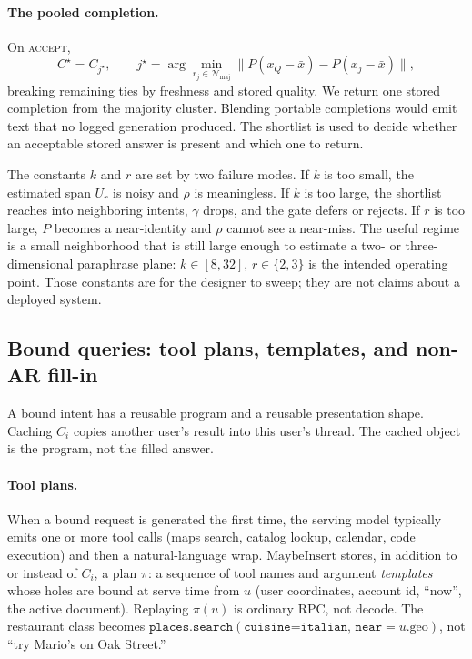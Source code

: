 \paragraph{The pooled completion.}
On \textsc{accept},
\begin{equation}
\label{eq:pool}
C^\star
  = C_{j^\star},
  \qquad
  j^\star
  = \arg\min_{r_j\in\mathcal{N}_{\mathrm{maj}}}
      \bigl\|P(x_Q-\bar x)-P(x_j-\bar x)\bigr\|,
\end{equation}
breaking remaining ties by freshness and stored quality. We return one stored completion from the majority cluster. Blending portable completions would emit text that no logged generation produced. The shortlist is used to decide whether an acceptable stored answer is present and which one to return.

The constants $k$ and $r$ are set by two failure modes. If $k$ is too small, the estimated span $U_r$ is noisy and $\rho$ is meaningless. If $k$ is too large, the shortlist reaches into neighboring intents, $\gamma$ drops, and the gate defers or rejects. If $r$ is too large, $P$ becomes a near-identity and $\rho$ cannot see a near-miss. The useful regime is a small neighborhood that is still large enough to estimate a two- or three-dimensional paraphrase plane: $k\in[8,32]$, $r\in\{2,3\}$ is the intended operating point. Those constants are for the designer to sweep; they are not claims about a deployed system.

\subsection{Bound queries: tool plans, templates, and non-AR fill-in}
\label{sec:method-fill}

A bound intent has a reusable program and a reusable presentation shape. Caching $C_i$ copies another user's result into this user's thread. The cached object is the program, not the filled answer.

\paragraph{Tool plans.}
When a bound request is generated the first time, the serving model typically emits one or more tool calls (maps search, catalog lookup, calendar, code execution) and then a natural-language wrap. $\mathrm{MaybeInsert}$ stores, in addition to or instead of $C_i$, a plan $\pi$: a sequence of tool names and argument \emph{templates} whose holes are bound at serve time from $u$ (user coordinates, account id, ``now'', the active document). Replaying $\pi(u)$ is ordinary RPC, not decode. The restaurant class becomes $\texttt{places.search}(\texttt{cuisine=italian},\,\texttt{near}=u.\mathrm{geo})$, not ``try Mario's on Oak Street.''

